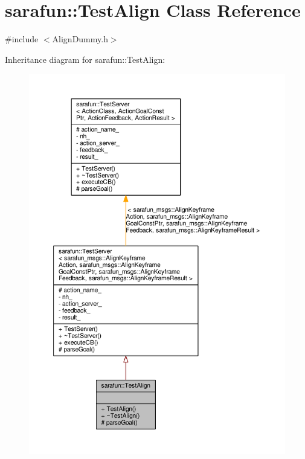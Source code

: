 \hypertarget{classsarafun_1_1TestAlign}{\section{sarafun\-:\-:Test\-Align Class Reference}
\label{classsarafun_1_1TestAlign}
}


{\ttfamily \#include $<$Align\-Dummy.\-h$>$}



Inheritance diagram for sarafun\-:\-:Test\-Align\-:\nopagebreak
\begin{figure}[H]
\begin{center}
\leavevmode
\includegraphics[width=350pt]{df/d5d/classsarafun_1_1TestAlign__inherit__graph}
\end{center}
\end{figure}


